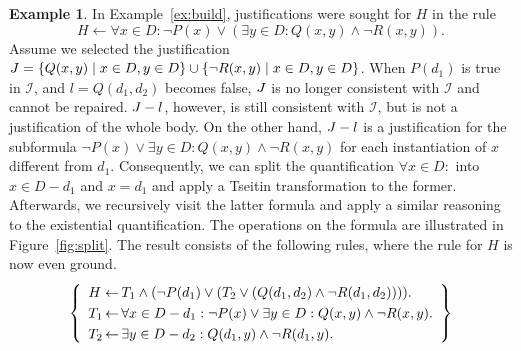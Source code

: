 \documentclass[11pt]{article}
\makeatletter
\newcommand{\m}[1]{\ensuremath{#1}\xspace}
\newcommand{\lrule}{\m{\leftarrow}}
\newcommand{\I}{\m{\mathcal{I}}}
\newcommand{\typed}[2]{\m{#1\in #2:}}
\newenvironment{ldef}{\renewcommand\arraystretch{1.25}\left\{\begin{array}{l@{ \,}l@{\,}l}}{\end{array}\right\}}
\newenvironment{ltheo}{\[\begin{array}{l}}{\end{array}\]\ignorespacesafterend}
\theoremstyle{plain}
\theoremstyle{definition}
\theoremstyle{example_basic}
\newtheorem{example}[thm]{Example}
\theoremstyle{example_contd}
\theoremstyle{plain}
\newcommand{\change}[1]{#1}
\makeatother
\begin{document}
\begin{example}\label{ex:bodysplit}
In Example~\ref{ex:build}, justifications were sought for $H$ in the
rule \[H \lrule \forall \typed{x}{D} \lnot P(x) \lor (\exists
\typed{y}{D} Q(x,y) \land \lnot R(x,y)).\] Assume we selected the
justification $J=\{Q(x,y) \mid x\in D, y \in D\} \cup \{\lnot
R(x,y) \mid x\in D, y \in D\}$. 
\change{When $P(d_1)$ is true in \I, and $l=Q(d_1,d_2)$ becomes false,
  $J$ is no longer consistent with \I and cannot be repaired.}
$J-l$, however, is still consistent with \I, but is not a
justification of the whole body. On the other hand, $J-l$ is a
justification for the subformula $\lnot P(x) \lor \exists \typed{y}{D}
Q(x,y) \land \lnot R(x,y)$ for each instantiation of $x$ different
from $d_1$. Consequently, we can split the quantification $\forall
\typed{x}{D}$ into $x\in D-d_1$ and $x=d_1$ and apply a Tseitin
transformation to the former. Afterwards, we recursively visit the
latter formula and apply a similar reasoning to the existential
quantification. The operations on the formula are illustrated in
Figure~\ref{fig:split}. The result consists of the following rules, where the rule for $H$ is now even ground. 
\begin{ltheo}
\begin{ldef}
\LRule{H}{T_1 \land (\lnot P(d_1) \lor (T_2 \lor (Q(d_1,d_2) \land \lnot R(d_1,d_2))))}\\
\LRule{T_1}{\forall \typed{x}{D - d_1} \lnot P(x) \lor \exists \typed{y}{D} Q(x,y) \land \lnot R(x,y)}\\
\LRule{T_2}{\exists \typed{y}{D- d_2} Q(d_1,y) \land \lnot R(d_1,y)}
\end{ldef}
\end{ltheo}


\end{example}
\end{document}
